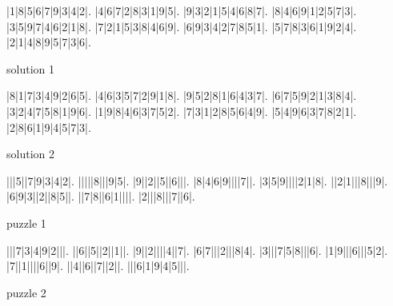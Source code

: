 \documentclass[12pt, letterpaper]{article}
\begin{document}
\thispagestyle{empty}
\begin{multicols}{2}
\begin{sudoku}
|1|8|5|6|7|9|3|4|2|.
|4|6|7|2|8|3|1|9|5|.
|9|3|2|1|5|4|6|8|7|.
|8|4|6|9|1|2|5|7|3|.
|3|5|9|7|4|6|2|1|8|.
|7|2|1|5|3|8|4|6|9|.
|6|9|3|4|2|7|8|5|1|.
|5|7|8|3|6|1|9|2|4|.
|2|1|4|8|9|5|7|3|6|.
\end{sudoku}
\begin{center}
    solution 1
\end{center}
\vspace{0.2cm}
\begin{sudoku}
|8|1|7|3|4|9|2|6|5|.
|4|6|3|5|7|2|9|1|8|.
|9|5|2|8|1|6|4|3|7|.
|6|7|5|9|2|1|3|8|4|.
|3|2|4|7|5|8|1|9|6|.
|1|9|8|4|6|3|7|5|2|.
|7|3|1|2|8|5|6|4|9|.
|5|4|9|6|3|7|8|2|1|.
|2|8|6|1|9|4|5|7|3|.
\end{sudoku}
\begin{center}
    solution 2
\end{center}
\columnbreak
\begin{sudoku}
|||5||7|9|3|4|2|.
|||||8|||9|5|.
|9||2||5||6|||.
|8|4|6|9||||7||.
|3|5|9||||2|1|8|.
||2|1|||8|||9|.
|6|9|3||2||8|5||.
||7|8||6|1||||.
|2|||8|||7||6|.
\end{sudoku}
\begin{center}
    puzzle 1
\end{center}
\begin{sudoku}
|||7|3|4|9|2|||.
||6||5||2||1||.
|9||2||||4||7|.
|6|7|||2|||8|4|.
|3|||7|5|8|||6|.
|1|9|||6|||5|2|.
|7||1||||6||9|.
||4||6||7||2||.
|||6|1|9|4|5|||.
\end{sudoku}
\begin{center}
    puzzle 2
\end{center}
\end{multicols}
\newpage
\end{document}

